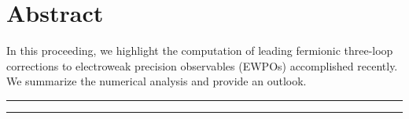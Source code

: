 \documentclass[Physsubmission, Phys]{SciPost}
\begin{document}
\section*{Abstract}
{\bf

In this proceeding, we highlight the computation of leading fermionic three-loop corrections to electroweak precision observables (EWPOs) accomplished recently. We summarize the numerical analysis and provide an outlook.
}


\vspace{10pt}
\noindent\rule{\textwidth}{1pt}
\tableofcontents\thispagestyle{fancy}
\noindent\rule{\textwidth}{1pt}
\vspace{10pt}
\end{document}
